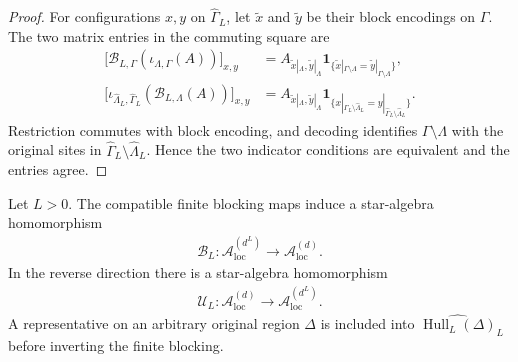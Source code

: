\begin{proof}\leanok
    For configurations $x,y$ on $\widehat\Gamma_L$, let $\widetilde x$ and
    $\widetilde y$ be their block encodings on $\Gamma$.  The two matrix
    entries in the commuting square are
    \begin{align}
        \bigl[\mathcal B_{L,\Gamma}
            (\iota_{\Lambda,\Gamma}(A))\bigr]_{x,y}
         & =A_{\widetilde x|_\Lambda,\widetilde y|_\Lambda}
        \mathbf 1_{\{\widetilde x|_{\Gamma\setminus\Lambda}
        =\widetilde y|_{\Gamma\setminus\Lambda}\}},         \\
        \bigl[\iota_{\widehat\Lambda_L,\widehat\Gamma_L}
            (\mathcal B_{L,\Lambda}(A))\bigr]_{x,y}
         & =A_{\widetilde x|_\Lambda,\widetilde y|_\Lambda}
        \mathbf 1_{\{x|_{\widehat\Gamma_L\setminus\widehat\Lambda_L}
                =y|_{\widehat\Gamma_L\setminus\widehat\Lambda_L}\}}.
    \end{align}
    Restriction commutes with block encoding, and decoding identifies
    $\Gamma\setminus\Lambda$ with the original sites in
    $\widehat\Gamma_L\setminus\widehat\Lambda_L$.  Hence the two indicator
    conditions are equivalent and the entries agree.
\end{proof}

\begin{definition}
    \label{def:qca_algebraic_blocking_maps}
    \leanok
    Let $L>0$.  The compatible finite blocking maps induce a star-algebra
    homomorphism
    \begin{align}
        \mathcal B_L:\mathcal A_{\mathrm{loc}}^{(d^L)}
        \longrightarrow\mathcal A_{\mathrm{loc}}^{(d)}.
    \end{align}
    In the reverse direction there is a star-algebra homomorphism
    \begin{align}
        \mathcal U_L:\mathcal A_{\mathrm{loc}}^{(d)}
        \longrightarrow\mathcal A_{\mathrm{loc}}^{(d^L)}.
    \end{align}
    A representative on an arbitrary original region $\Delta$ is included into
    $\widehat{\operatorname{Hull}_L(\Delta)}_L$ before inverting the finite
    blocking.
\end{definition}

